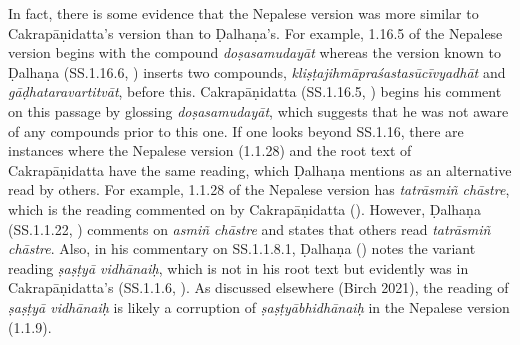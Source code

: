 

 

In fact, there is some evidence that the Nepalese version was more similar to Cakrapāṇidatta's version than to Ḍalhaṇa's. For example, 1.16.5 of the Nepalese version begins with the compound \emph{doṣasamudayāt} whereas the version known to Ḍalhaṇa (SS.1.16.6, \cite[77]{vulgate}) inserts two compounds, \emph{kliṣṭajihmāpraśastasūcīvyadhāt} and \emph{gāḍhataravartitvāt}, before this. Cakrapāṇidatta (SS.1.16.5, \cite[126–127]{acar-1939}) begins his comment on this passage by glossing \emph{doṣasamudayāt}, which suggests that he was not aware of any compounds prior to this one. If one looks beyond SS.1.16, there are instances where the Nepalese version (1.1.28) and the root text of Cakrapāṇidatta have the same reading, which Ḍalhaṇa mentions as an alternative read by others. For example, 1.1.28 of the Nepalese version has \emph{tatrāsmiñ chāstre}, which is the reading commented on by Cakrapāṇidatta (\cite[17]{acar-1939}). However, Ḍalhaṇa  (SS.1.1.22, \cite[5]{vulgate}) comments on \emph{asmiñ chāstre} and states that others read \emph{tatrāsmiñ chāstre}. Also, in his commentary on SS.1.1.8.1, Ḍalhaṇa (\cite[5]{vulgate}) notes the variant reading \emph{ṣaṣṭyā vidhānaiḥ}, which is not in his root text but evidently was in Cakrapāṇidatta's  (SS.1.1.6, \cite[11]{acar-1939}). As discussed elsewhere (Birch 2021), the reading of \emph{ṣaṣṭyā vidhānaiḥ} is likely a corruption of \emph{ṣaṣṭyābhidhānaiḥ} in the Nepalese version (1.1.9). 

